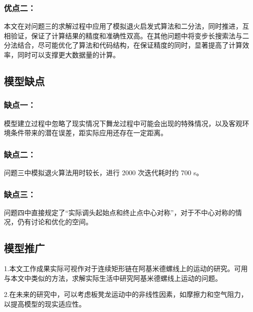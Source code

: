 \documentclass[zihao=-4, UTF8]{article}		%
\theoremstyle{MyLineTheoremStyle} %
\theoremstyle{MyBlockTheoremStyle} %
\theoremstyle{MySubsubsectionStyle} %
\begin{document}
\subsubsection{优点二：}
本文在对问题三的求解过程中应用了模拟退火启发式算法和二分法，同时推进，互相验证，保证了计算结果的精度和准确性双高。在其他问题中将变步长搜索法与二分法结合，尽可能优化了算法和代码结构，在保证精度的同时，显著提高了计算效率，同时可以支撑更大数据量的计算。
\subsection{模型缺点}
\subsubsection{缺点一：}
模型建立过程中忽略了现实情况下舞龙过程中可能会出现的特殊情况，以及客观环境条件带来的潜在误差，距实际应用还存在一定距离。
\subsubsection{缺点二：}
问题三中模拟退火算法用时较长，进行 2000 次迭代耗时约 700 s。

\subsubsection{缺点三：}
问题四中直接规定了“实际调头起始点和终止点中心对称”，对于不中心对称的情况，仍有讨论和优化的空间。

\subsection{模型推广}

1.本文工作成果实际可视作对于连续矩形链在阿基米德螺线上的运动的研究。可用与本文中类似的方法，求解实际生活中研究阿基米德螺线上运动的问题。\par

2.在未来的研究中，可以考虑板凳龙运动中的非线性因素，如摩擦力和空气阻力，以提高模型的现实适应性。\par

\nocite{*}



\newpage
\appendix
{}
\titleformat{\subsection}{\normalsize\bfseries}{\thesubsection}{1em}{}
\end{document}
